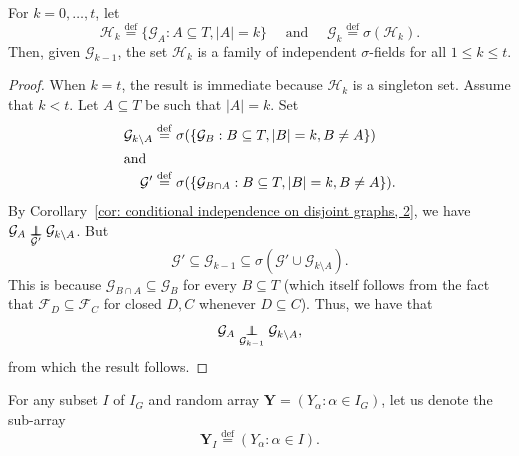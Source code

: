 \documentclass[10pt]{amsart}
\theoremstyle{definition}\newtheorem{defi}[theo]{Definition}\newtheorem{rema}[theo]{Remark}\newtheorem{exam}[theo]{Example}\newtheorem{exem}[theo]{Example}\newtheorem{nota}[theo]{Notation}
\newcommand{\independent}{\protect\mathpalette{\protect\independenT}{\perp}}\def\independenT#1#2{\mathrel{\rlap{$#1#2$}\mkern2mu{#1#2}}}
\newcommand{\alf}{\alpha}%
\newcommand*{\defeq}{\stackrel{\mathrm{def}}{=}}
\newcommand*\FF{\mathcal{F}}
\newcommand*\GG{\mathcal{G}}
\newcommand*\HH{\mathcal{H}}
\newcommand*\bY{\mathbf{Y}}
\begin{document}
\begin{coro}\label{prop:inductive joining of distributional equalities}
For $k=0,\ldots,t$, let
\[
\HH_k
\defeq \{\GG_A : A\subseteq T, |A|=k\}\quad\text{ and }\quad\GG_k
\defeq \sigma(\HH_k).
\]
Then, given $\GG_{k-1}$, the set $\HH_k$ is a {family of independent $\sigma$-fields} for all $1 \leq k \leq t$.
\end{coro}

\begin{proof}
When $k=t$, the result is immediate because $\HH_k$ is a singleton set. Assume that $k < t$. Let $A \subseteq T$ be such that $|A|=k$. Set
\begin{align*}
\GG_{k\setminus A}
&\defeq\sigma(\{\GG_B : B \subseteq T, |B|=k, B \neq A\})
\\
\intertext{and}
\GG'
&\defeq\sigma(\{\GG_{B \cap A}: B \subseteq T, |B|=k, B\neq A\}).
\end{align*}
By Corollary~\ref{cor: conditional independence on disjoint graphs, 2}, we have $\GG_A \underset{\GG'}{\independent} \GG_{k\setminus A}$. But
\[
\GG' \subseteq \GG_{k-1} \subseteq \sigma(\GG'\cup \GG_{k\setminus A}).
\]
This is because $\GG_{B \cap A} \subseteq \GG_B$ for every $B \subseteq T$ (which itself follows from the fact that $\FF_D \subseteq \FF_C$ for closed $D,C$ whenever $D \subseteq C$). Thus, we have that
\[
\GG_A \underset{\GG_{k-1}}{\independent} \GG_{k\setminus A},
\]
from which the result follows.
\end{proof}

For any subset $I$ of $I_G$ and random array $\bY = (Y_\alf : \alf \in I_G)$, let us denote the sub-array
\[
\bY_I
\defeq(Y_\alf : \alf \in I).
\]
\end{document}
